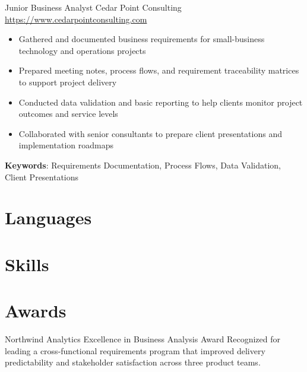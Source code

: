 \documentclass[a4paper, serif, 10pt]{moderncv}
\begin{document}
        {Junior Business Analyst}
        {Cedar Point Consulting}
        {\url{https://www.cedarpointconsulting.com}}
        {}
        {\begin{itemize}
\item Gathered and documented business requirements for small-business technology and operations projects
\item Prepared meeting notes, process flows, and requirement traceability matrices to support project delivery
\item Conducted data validation and basic reporting to help clients monitor project outcomes and service levels
\item Collaborated with senior consultants to prepare client presentations and implementation roadmaps
\end{itemize}
\textbf{Keywords}: Requirements Documentation, Process Flows, Data Validation, Client Presentations}
\section{Languages}

\section{Skills}

\section{Awards}

        {Northwind Analytics}
        {Excellence in Business Analysis Award}
        {}
        {}
        {Recognized for leading a cross-functional requirements program that improved delivery predictability and stakeholder satisfaction across three product teams.}
\end{document}
